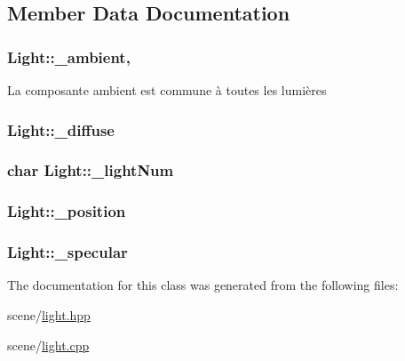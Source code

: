 \subsection{Member Data Documentation}
\hypertarget{class_light_ab139b739498b75944c99203027332ad9}{
\subsubsection[{\+\_\+ambient}]{ Light\+::\+\_\+ambient\hspace{0.3cm}{\ttfamily [static]}, {\ttfamily [private]}}}\label{class_light_ab139b739498b75944c99203027332ad9}
La composante ambient est commune à toutes les lumières \hypertarget{class_light_a32445f2054766ef532c29eb514b2599d}{
\subsubsection[{\+\_\+diffuse}]{ Light\+::\+\_\+diffuse\hspace{0.3cm}{\ttfamily [private]}}}\label{class_light_a32445f2054766ef532c29eb514b2599d}
\hypertarget{class_light_a072b63fbb9a1269db4241e09db7588b1}{
\subsubsection[{\+\_\+light\+Num}]{\setlength{\rightskip}{0pt plus 5cm}char Light\+::\+\_\+light\+Num\hspace{0.3cm}{\ttfamily [private]}}}\label{class_light_a072b63fbb9a1269db4241e09db7588b1}
\hypertarget{class_light_a3af8c823a869606782bd9e1872586b72}{
\subsubsection[{\+\_\+position}]{ Light\+::\+\_\+position\hspace{0.3cm}{\ttfamily [private]}}}\label{class_light_a3af8c823a869606782bd9e1872586b72}
\hypertarget{class_light_a36414dc1e8a75b36652bc5a12b2ea43d}{
\subsubsection[{\+\_\+specular}]{ Light\+::\+\_\+specular\hspace{0.3cm}{\ttfamily [private]}}}\label{class_light_a36414dc1e8a75b36652bc5a12b2ea43d}


The documentation for this class was generated from the following files\+:\begin{DoxyCompactItemize}
\item 
scene/\hyperlink{light_8hpp}{light.\+hpp}\item 
scene/\hyperlink{light_8cpp}{light.\+cpp}\end{DoxyCompactItemize}
